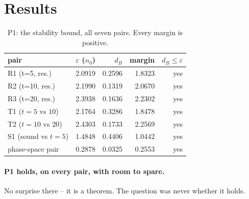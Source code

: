 \documentclass[11pt,a4paper]{article}
\newcommand{\dB}{d_{B}}
\begin{document}
\section{Results}
\label{sec:results}

\begin{table}[h]\centering\small
\begin{tabular}{@{}lrrrr@{}}
\toprule
pair & $\varepsilon$ ($n_0$) & $\dB$ & margin & $\dB\le\varepsilon$ \\
\midrule
R1 (t=5, res.) & 2.0919 & 0.2596 & 1.8323 & yes \\
R2 (t=10, res.) & 2.1990 & 0.1319 & 2.0670 & yes \\
R3 (t=20, res.) & 2.3938 & 0.1636 & 2.2302 & yes \\
T1 ($t{=}5$ vs $10$) & 2.1764 & 0.3286 & 1.8478 & yes \\
T2 ($t{=}10$ vs $20$) & 2.4303 & 0.1733 & 2.2569 & yes \\
S1 (sound vs $t{=}5$) & 1.4848 & 0.4406 & 1.0442 & yes \\
phase-space pair & 0.2878 & 0.0325 & 0.2553 & yes \\
\bottomrule
\end{tabular}
\caption{P1: the stability bound, all seven pairs. Every margin is positive.}
\label{tab:p1}
\end{table}

\paragraph{P1 holds, on every pair, with room to spare.} No surprise there -- it is a theorem. The
question was never whether it holds.
\end{document}
